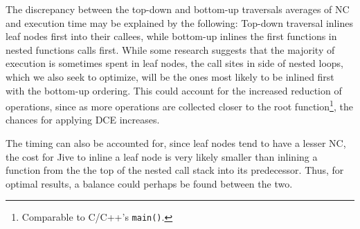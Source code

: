 The discrepancy between the top-down and bottom-up traversals averages of NC and
execution time may be explained by the following: Top-down traversal inlines
leaf nodes first into their callees, while bottom-up inlines the first functions
in nested functions calls first. While some research suggests that the majority
of execution is sometimes spent in leaf nodes, the call sites in side of nested
loops, which we also seek to optimize, will be the ones most likely to be
inlined first with the bottom-up ordering. This could account for the increased
reduction of operations, since as more operations are collected closer to the
root function\footnote{Comparable to C/C++'s \lstinline!main()!.}, the chances
for applying DCE increases.

The timing can also be accounted for, since leaf nodes tend to have a lesser NC,
the cost for Jive to inline a leaf node is very likely smaller than inlining a
function from the the top of the nested call stack into its predecessor. Thus,
for optimal results, a balance could perhaps be found between the two.


